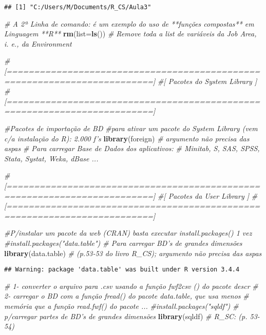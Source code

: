 \documentclass[]{article}
\newenvironment{Shaded}{\begin{snugshade}}{\end{snugshade}}
\newcommand{\KeywordTok}[1]{\textcolor[rgb]{0.13,0.29,0.53}{\textbf{#1}}}
\newcommand{\DataTypeTok}[1]{\textcolor[rgb]{0.13,0.29,0.53}{#1}}
\newcommand{\CommentTok}[1]{\textcolor[rgb]{0.56,0.35,0.01}{\textit{#1}}}
\newcommand{\NormalTok}[1]{#1}
\begin{document}
\begin{verbatim}
## [1] "C:/Users/M/Documents/R_CS/Aula3"
\end{verbatim}

\begin{Shaded}
\begin{Highlighting}[]
\CommentTok{# A 2ª Linha de comando: é um exemplo do uso de **funções compostas** em Linguagem **R**}
\KeywordTok{rm}\NormalTok{(}\DataTypeTok{list=}\KeywordTok{ls}\NormalTok{()) }\CommentTok{# Remove toda a list de variáveis da Job Area, i. e., da Environment}

\CommentTok{#[=========================================================================]}
\CommentTok{#[                   Pacotes do System Library                             ]}
\CommentTok{#[=========================================================================]}

\CommentTok{#Pacotes de importação de BD}
\CommentTok{#para ativar um pacote do System Library (vem c/a instalação do R): 2.000 f's}
\KeywordTok{library}\NormalTok{(foreign) }\CommentTok{# argumento não precisa das aspas}
\CommentTok{# Para carregar Base de Dados dos aplicativos:}
\CommentTok{# Minitab, S, SAS, SPSS, Stata, Systat, Weka, dBase ...}

\CommentTok{#[=========================================================================]}
\CommentTok{#[                    Pacotes da User Library                              ]}
\CommentTok{#[=========================================================================]}

\CommentTok{#P/instalar um pacote da web (CRAN) basta executar install.packages() 1 vez}
\CommentTok{#install.packages("data.table") # Para carregar BD's de grandes dimensões}
\KeywordTok{library}\NormalTok{(data.table) }\CommentTok{# (p.53-53 do livro R_CS); argumento não precisa das aspas}
\end{Highlighting}
\end{Shaded}

\begin{verbatim}
## Warning: package 'data.table' was built under R version 3.4.4
\end{verbatim}

\begin{Shaded}
\begin{Highlighting}[]
\CommentTok{# 1- converter o arquivo para .csv usando a função fwf2csv () do pacote descr}
\CommentTok{# 2- carregar o BD com a função fread() do pacote data.table, que usa menos}
\CommentTok{#    memória que a função read.fwf() do pacote ...}
\CommentTok{#install.packages("sqldf") # p/carregar partes de BD's de grandes dimensões}
\KeywordTok{library}\NormalTok{(sqldf) }\CommentTok{# R_SC: (p. 53-54)}
\end{Highlighting}
\end{Shaded}
\end{document}
